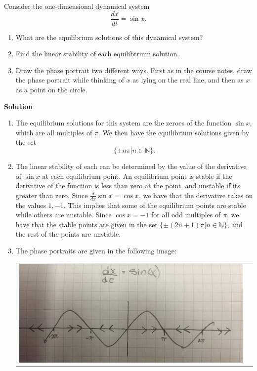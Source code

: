 \documentclass[12pt]{article}
\newenvironment{exercise}[2][Exercise]{\begin{trivlist}
\item[\hskip \labelsep {\bfseries #1}\hskip \labelsep {\bfseries #2.}]}{\end{trivlist}}
\begin{document}
\begin{exercise}{2}
Consider the one-dimensional dynamical system 
$$\frac{dx}{dt} = \sin{x}.$$

\begin{enumerate}
\item[a)] What are the equilibrium solutions of this dynamical system?
\item[b)] Find the linear stability of each equilibtrium solution.
\item[c)] Draw the phase portrait two different ways. First as in the course notes, draw the phase portrait while thinking of $x$ as lying on the real line, and then as $x$ as a point on the circle.
\end{enumerate}

\textbf{Solution}
\\
\begin{enumerate}
	\item[a)]The equilibrium solutions for this system are the zeroes of the function $\sin{x}$, which are all multiples of $\pi$. We then have the equilibrium solutions given by the set $$\{\pm n \pi | n \in \mathbb{N}\}.$$
	\item[b)] The linear stability of each can be determined by the value of the derivative of $\sin{x}$ at each equilibrium point. An equilibrium point is stable if the derivative of the function is less than zero at the point, and unstable if its greater than zero. Since $\frac{d}{dx}\sin{x} = \cos{x}$, we have that the derivative takes on the values $1, -1$. This implies that some of the equilibrium points are stable while others are unstable. Since $\cos{x} = -1$ for all odd multiples of $\pi$, we have that the stable points are given in the set $\{\pm (2n + 1) \pi | n \in \mathbb{N}\}$, and the rest of the points are unstable.
	\item[c)] The phase portraits are given in the following image:\\
	\begin{tabular}{ll}
	\includegraphics[scale=.05]{phaseportrait2} &

\end{tabular}
\end{enumerate}
\end{exercise}
\end{document}

